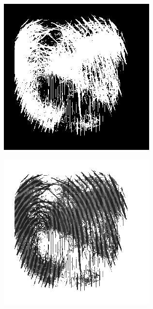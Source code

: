 \documentclass{beamer}
\begin{document}
{\begin{figure}[!ht]
\begin{subfigure}[ht]{0.15\textwidth}
        \end{subfigure}
        \qquad
        \begin{subfigure}[ht]{0.15\textwidth}
            \includegraphics[width=\textwidth]{fingerprints/2002Db3a/1_2_mask.jpg}
        \end{subfigure}
        \qquad
        \begin{subfigure}[ht]{0.15\textwidth}
            \includegraphics[width=\textwidth]{fingerprints/2002Db3a/1_2_filtered.jpg}

\end{subfigure}
\end{figure}}
\end{document}
